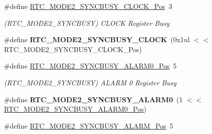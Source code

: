 \begin{DoxyCompactItemize}
\item 
\hypertarget{group___s_a_m_l21___r_t_c_ga55fdd14a6f7383b2c65687cae59b426f}{}\#define \hyperlink{group___s_a_m_l21___r_t_c_ga55fdd14a6f7383b2c65687cae59b426f}{R\+T\+C\+\_\+\+M\+O\+D\+E2\+\_\+\+S\+Y\+N\+C\+B\+U\+S\+Y\+\_\+\+C\+L\+O\+C\+K\+\_\+\+Pos}~3\label{group___s_a_m_l21___r_t_c_ga55fdd14a6f7383b2c65687cae59b426f}

\begin{DoxyCompactList}\small\item\em (R\+T\+C\+\_\+\+M\+O\+D\+E2\+\_\+\+S\+Y\+N\+C\+B\+U\+S\+Y) C\+L\+O\+C\+K Register Busy \end{DoxyCompactList}\item 
\hypertarget{group___s_a_m_l21___r_t_c_ga89d31437a124e0ee365db62a11ea50cb}{}\#define {\bfseries R\+T\+C\+\_\+\+M\+O\+D\+E2\+\_\+\+S\+Y\+N\+C\+B\+U\+S\+Y\+\_\+\+C\+L\+O\+C\+K}~(0x1ul $<$$<$ R\+T\+C\+\_\+\+M\+O\+D\+E2\+\_\+\+S\+Y\+N\+C\+B\+U\+S\+Y\+\_\+\+C\+L\+O\+C\+K\+\_\+\+Pos)\label{group___s_a_m_l21___r_t_c_ga89d31437a124e0ee365db62a11ea50cb}

\item 
\hypertarget{group___s_a_m_l21___r_t_c_ga087e26abd161c57f04f7b29d15706429}{}\#define \hyperlink{group___s_a_m_l21___r_t_c_ga087e26abd161c57f04f7b29d15706429}{R\+T\+C\+\_\+\+M\+O\+D\+E2\+\_\+\+S\+Y\+N\+C\+B\+U\+S\+Y\+\_\+\+A\+L\+A\+R\+M0\+\_\+\+Pos}~5\label{group___s_a_m_l21___r_t_c_ga087e26abd161c57f04f7b29d15706429}

\begin{DoxyCompactList}\small\item\em (R\+T\+C\+\_\+\+M\+O\+D\+E2\+\_\+\+S\+Y\+N\+C\+B\+U\+S\+Y) A\+L\+A\+R\+M 0 Register Busy \end{DoxyCompactList}\item 
\hypertarget{group___s_a_m_l21___r_t_c_ga156e15a6fb66ede0adeba33db2a5c9b0}{}\#define {\bfseries R\+T\+C\+\_\+\+M\+O\+D\+E2\+\_\+\+S\+Y\+N\+C\+B\+U\+S\+Y\+\_\+\+A\+L\+A\+R\+M0}~(1 $<$$<$ \hyperlink{group___s_a_m_l21___r_t_c_ga087e26abd161c57f04f7b29d15706429}{R\+T\+C\+\_\+\+M\+O\+D\+E2\+\_\+\+S\+Y\+N\+C\+B\+U\+S\+Y\+\_\+\+A\+L\+A\+R\+M0\+\_\+\+Pos})\label{group___s_a_m_l21___r_t_c_ga156e15a6fb66ede0adeba33db2a5c9b0}

\item 
\hypertarget{group___s_a_m_l21___r_t_c_ga203119d9c089d5879778b676012fc2bb}{}\#define \hyperlink{group___s_a_m_l21___r_t_c_ga203119d9c089d5879778b676012fc2bb}{R\+T\+C\+\_\+\+M\+O\+D\+E2\+\_\+\+S\+Y\+N\+C\+B\+U\+S\+Y\+\_\+\+A\+L\+A\+R\+M\+\_\+\+Pos}~5\label{group___s_a_m_l21___r_t_c_ga203119d9c089d5879778b676012fc2bb}


\end{DoxyCompactItemize}
